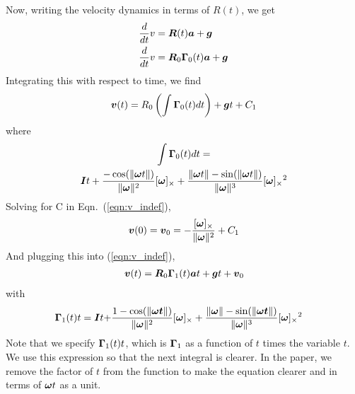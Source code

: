 Now, writing the velocity dynamics in terms of $R(t)$, we get
\begin{align}
    \frac{d}{dt} v &= \boldsymbol{R}(t)\boldsymbol{a} + \boldsymbol{g} \\
    \frac{d}{dt} v &= \boldsymbol{R}_0\boldsymbol{\Gamma}_0(t)\boldsymbol{a} + \boldsymbol{g}
\end{align}
Integrating this with respect to time, we find
\begin{align}
    \boldsymbol{v}(t) = R_0 \left(\int \boldsymbol{\Gamma}_0(t) dt\right) + \boldsymbol{g}t + C_1 \label{eqn:v_indef}
\end{align}
where
\begin{multline}
    \int\boldsymbol{\Gamma}_0(t) dt =\\\boldsymbol{I}t + \frac{-\cos(\Vert\boldsymbol{\omega} t\Vert)}{\Vert\boldsymbol{\omega}\Vert^2}[\boldsymbol{\omega}]_\times + \frac{\Vert\boldsymbol{\omega} t\Vert - \sin(\Vert\boldsymbol{\omega} t\Vert)}{\Vert\boldsymbol{\omega} \Vert^3}[\boldsymbol{\omega}]_\times{}^2
\end{multline}
Solving for C in Eqn.~(\ref{eqn:v_indef}),
\begin{align}
    \boldsymbol{v}(0) = \boldsymbol{v}_0 = -\frac{[\boldsymbol{\omega}]_\times}{\Vert\boldsymbol{\omega}\Vert^2} + C_1
\end{align}
And plugging this into (\ref{eqn:v_indef}),
\begin{align}
    \boldsymbol{v}(t) = \boldsymbol{R}_0\boldsymbol{\Gamma}_1(t)\boldsymbol{a}t + \boldsymbol{g}t + \boldsymbol{v}_0
\end{align}
with
\begin{align}
    \boldsymbol{\Gamma}_1(t)t = \boldsymbol{I}t + &\frac{1-\cos(\Vert\boldsymbol{\omega t}\Vert)}{\Vert\boldsymbol{\omega }\Vert^2}[\boldsymbol{\omega} ]_\times + \frac{\Vert\boldsymbol{\omega}\Vert - \sin(\Vert\boldsymbol{\omega t} \Vert)}{\Vert\boldsymbol{\omega}\Vert^3}[\boldsymbol{\omega}]_\times{}^2
\end{align}
Note that we specify $\boldsymbol{\Gamma}_1(t) t$, which is $\boldsymbol{\Gamma}_1$ as a function of $t$ times the variable $t$.  We use this expression so that the next integral is clearer.  In the paper, we remove the factor of $t$ from the function to make the equation clearer and in terms of $\boldsymbol{\omega} t$ as a unit.

